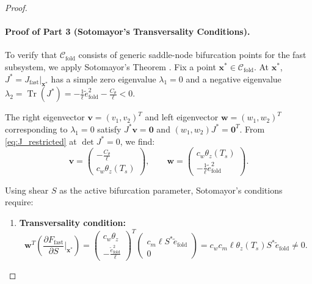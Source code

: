 \begin{proof}
\paragraph{Proof of Part 3 (Sotomayor's Transversality Conditions).}
To verify that $\mathcal{C}_{\mathrm{fold}}$ consists of generic saddle-node bifurcation points for the fast subsystem, we apply Sotomayor's Theorem \citep{krauskopf2007continuation}. Fix a point $\mathbf{x}^* \in \mathcal{C}_{\mathrm{fold}}$.
At $\mathbf{x}^*$, $J^* = \left. J_{\mathrm{fast}} \right|_{\mathbf{x}^*}$ has a simple zero eigenvalue $\lambda_1 = 0$ and a negative eigenvalue $\lambda_2 = \operatorname{Tr}(J^*) = -\frac{1}{\ell} \tilde e_{\mathrm{fold}}^2 - \frac{C_\theta}{\ell} < 0$.

The right eigenvector $\mathbf{v} = (v_1, v_2)^T$ and left eigenvector $\mathbf{w} = (w_1, w_2)^T$ corresponding to $\lambda_1 = 0$ satisfy $J^* \mathbf{v} = \mathbf{0}$ and $(w_1, w_2) J^* = \mathbf{0}^T$.
From \eqref{eq:J_restricted} at $\det J^* = 0$, we find:
\begin{equation}
\mathbf{v} = \begin{pmatrix} -\frac{C_\theta}{\ell} \\[4pt] c_w \theta_z(T_s) \end{pmatrix}, \qquad
\mathbf{w} = \begin{pmatrix} c_w \theta_z(T_s) \\[4pt] -\frac{1}{\ell} \tilde e_{\mathrm{fold}}^2 \end{pmatrix}.
\end{equation}

Using shear $S$ as the active bifurcation parameter, Sotomayor's conditions require:
\begin{enumerate}
    \item \textbf{Transversality condition:}
    \begin{equation}
    \mathbf{w}^T \left( \frac{\partial F_{\mathrm{fast}}}{\partial S}\Big|_{\mathbf{x}^*} \right) = \begin{pmatrix} c_w \theta_z \\[2pt] -\frac{\tilde e_{\mathrm{fold}}^2}{\ell} \end{pmatrix}^T \begin{pmatrix} c_m \ell S^* \tilde e_{\mathrm{fold}} \\[2pt] 0 \end{pmatrix} = c_w c_m \ell \theta_z(T_s) S^* \tilde e_{\mathrm{fold}} \neq 0.
    \end{equation}


\end{enumerate}
\end{proof}
